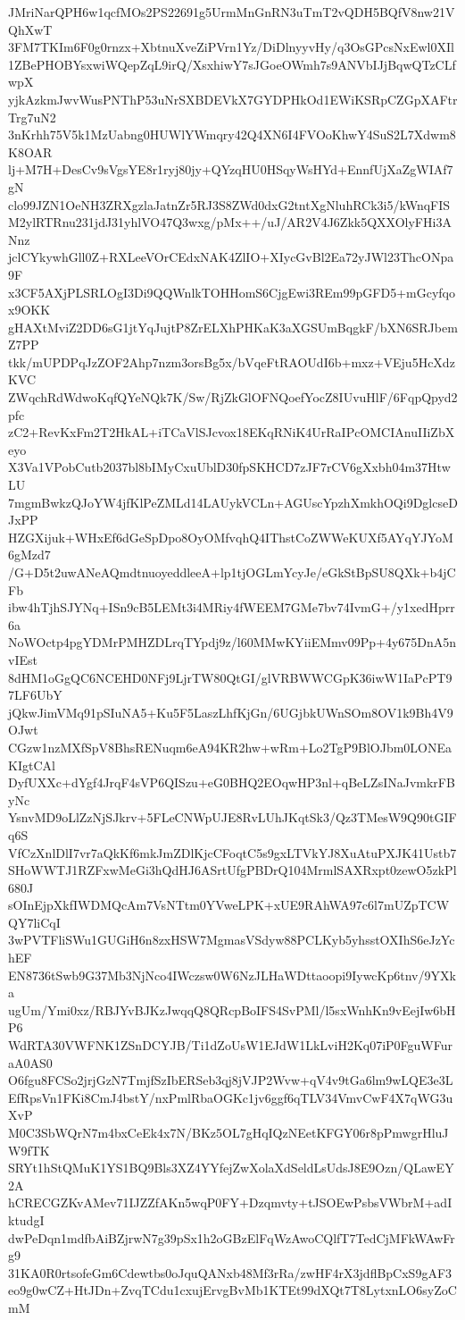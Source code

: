 JMriNarQPH6w1qcfMOs2PS22691g5UrmMnGnRN3uTmT2vQDH5BQfV8nw21VQhXwT
3FM7TKIm6F0g0rnzx+XbtnuXveZiPVrn1Yz/DiDlnyyvHy/q3OsGPcsNxEwl0XIl
1ZBePHOBYsxwiWQepZqL9irQ/XsxhiwY7sJGoeOWmh7s9ANVbIJjBqwQTzCLfwpX
yjkAzkmJwvWusPNThP53uNrSXBDEVkX7GYDPHkOd1EWiKSRpCZGpXAFtrTrg7uN2
3nKrhh75V5k1MzUabng0HUWlYWmqry42Q4XN6I4FVOoKhwY4SuS2L7Xdwm8K8OAR
lj+M7H+DesCv9sVgsYE8r1ryj80jy+QYzqHU0HSqyWsHYd+EnnfUjXaZgWIAf7gN
clo99JZN1OeNH3ZRXgzlaJatnZr5RJ3S8ZWd0dxG2tntXgNluhRCk3i5/kWnqFIS
M2ylRTRnu231jdJ31yhlVO47Q3wxg/pMx++/uJ/AR2V4J6Zkk5QXXOlyFHi3ANnz
jclCYkywhGll0Z+RXLeeVOrCEdxNAK4ZlIO+XIycGvBl2Ea72yJWl23ThcONpa9F
x3CF5AXjPLSRLOgI3Di9QQWnlkTOHHomS6CjgEwi3REm99pGFD5+mGcyfqox9OKK
gHAXtMviZ2DD6sG1jtYqJujtP8ZrELXhPHKaK3aXGSUmBqgkF/bXN6SRJbemZ7PP
tkk/mUPDPqJzZOF2Ahp7nzm3orsBg5x/bVqeFtRAOUdI6b+mxz+VEju5HcXdzKVC
ZWqchRdWdwoKqfQYeNQk7K/Sw/RjZkGlOFNQoefYocZ8IUvuHlF/6FqpQpyd2pfc
zC2+RevKxFm2T2HkAL+iTCaVlSJcvox18EKqRNiK4UrRaIPcOMCIAnuIIiZbXeyo
X3Va1VPobCutb2037bl8bIMyCxuUblD30fpSKHCD7zJF7rCV6gXxbh04m37HtwLU
7mgmBwkzQJoYW4jfKlPeZMLd14LAUykVCLn+AGUscYpzhXmkhOQi9DglcseDJxPP
HZGXijuk+WHxEf6dGeSpDpo8OyOMfvqhQ4IThstCoZWWeKUXf5AYqYJYoM6gMzd7
/G+D5t2uwANeAQmdtnuoyeddleeA+lp1tjOGLmYcyJe/eGkStBpSU8QXk+b4jCFb
ibw4hTjhSJYNq+ISn9cB5LEMt3i4MRiy4fWEEM7GMe7bv74IvmG+/y1xedHprr6a
NoWOctp4pgYDMrPMHZDLrqTYpdj9z/l60MMwKYiiEMmv09Pp+4y675DnA5nvIEst
8dHM1oGgQC6NCEHD0NFj9LjrTW80QtGI/glVRBWWCGpK36iwW1IaPcPT97LF6UbY
jQkwJimVMq91pSIuNA5+Ku5F5LaszLhfKjGn/6UGjbkUWnSOm8OV1k9Bh4V9OJwt
CGzw1nzMXfSpV8BhsRENuqm6eA94KR2hw+wRm+Lo2TgP9BlOJbm0LONEaKIgtCAl
DyfUXXc+dYgf4JrqF4sVP6QISzu+eG0BHQ2EOqwHP3nl+qBeLZsINaJvmkrFByNc
YsnvMD9oLlZzNjSJkrv+5FLeCNWpUJE8RvLUhJKqtSk3/Qz3TMesW9Q90tGIFq6S
VfCzXnlDlI7vr7aQkKf6mkJmZDlKjcCFoqtC5s9gxLTVkYJ8XuAtuPXJK41Ustb7
SHoWWTJ1RZFxwMeGi3hQdHJ6ASrtUfgPBDrQ104MrmlSAXRxpt0zewO5zkPl680J
sOInEjpXkfIWDMQcAm7VsNTtm0YVweLPK+xUE9RAhWA97c6l7mUZpTCWQY7liCqI
3wPVTFliSWu1GUGiH6n8zxHSW7MgmasVSdyw88PCLKyb5yhsstOXIhS6eJzYchEF
EN8736tSwb9G37Mb3NjNco4IWczsw0W6NzJLHaWDttaoopi9IywcKp6tnv/9YXka
ugUm/Ymi0xz/RBJYvBJKzJwqqQ8QRcpBoIFS4SvPMl/l5sxWnhKn9vEejIw6bHP6
WdRTA30VWFNK1ZSnDCYJB/Ti1dZoUsW1EJdW1LkLviH2Kq07iP0FguWFuraA0AS0
O6fgu8FCSo2jrjGzN7TmjfSzIbERSeb3qj8jVJP2Wvw+qV4v9tGa6lm9wLQE3e3L
EfRpsVn1FKi8CmJ4bstY/nxPmlRbaOGKc1jv6ggf6qTLV34VmvCwF4X7qWG3uXvP
M0C3SbWQrN7m4bxCeEk4x7N/BKz5OL7gHqIQzNEetKFGY06r8pPmwgrHluJW9fTK
SRYt1hStQMuK1YS1BQ9Bls3XZ4YYfejZwXolaXdSeldLsUdsJ8E9Ozn/QLawEY2A
hCRECGZKvAMev71IJZZfAKn5wqP0FY+Dzqmvty+tJSOEwPsbsVWbrM+adIktudgI
dwPeDqn1mdfbAiBZjrwN7g39pSx1h2oGBzElFqWzAwoCQlfT7TedCjMFkWAwFrg9
31KA0R0rtsofeGm6Cdewtbs0oJquQANxb48Mf3rRa/zwHF4rX3jdflBpCxS9gAF3
eo9g0wCZ+HtJDn+ZvqTCdu1cxujErvgBvMb1KTEt99dXQt7T8LytxnLO6syZoCmM
